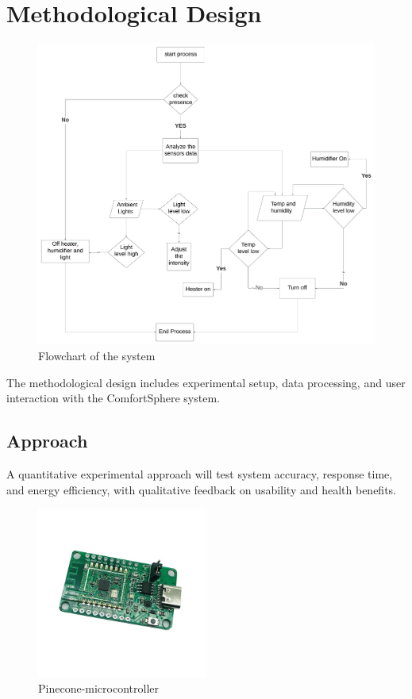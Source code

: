 \documentclass[a4paper]{scrartcl}
\begin{document}
\section{Methodological Design}
\begin{figure}[th]
    \centering
    \includegraphics[width=\linewidth]{diagram.jpg.png}
    \caption{Flowchart of the system}
    \label{fig:my_label}
\end{figure}
The methodological design includes experimental setup, data processing, and user interaction with the ComfortSphere system.
\subsection{Approach}
A quantitative experimental approach will test system accuracy, response time, and energy efficiency, with qualitative feedback on usability and health benefits.

\begin{figure}[th]
    \centering
    \includegraphics[width=0.5\textwidth]{Pinecone-1.jpg}
    \caption{Pinecone-microcontroller}
    \label{fig:my_label}
\end{figure}
\newpage
\end{document}
